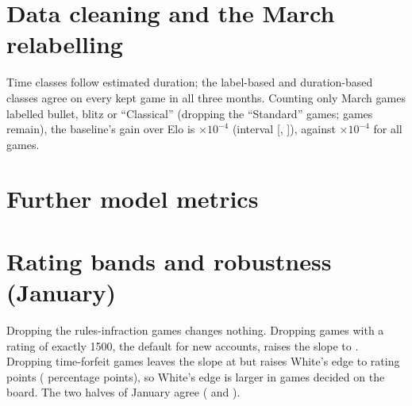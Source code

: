 \documentclass{article}
\newcommand{\tenm}{$\times 10^{-4}$}
\begin{document}
\appendix

\section{Data cleaning and the March relabelling}
\label{app:data}

\begin{table}[h]
  \centering
  \caption{Games removed at each cleaning step, in order.}
  \small
  
\end{table}

Time classes follow estimated duration; the label-based and duration-based classes agree on every kept game in all three months. Counting only March games labelled bullet, blitz or ``Classical'' (dropping the \nStandardMar{} ``Standard'' games; \nMarLabels{} games remain), the baseline's gain over Elo is \dEloBaseMarLabels\tenm{} (interval [\dEloBaseMarLabelsLo{}, \dEloBaseMarLabelsHi{}]), against \dEloBaseMar\tenm{} for all games.

\section{Further model metrics}
\label{app:models}

\begin{table}[h]
  \centering
  \caption{Paired CV differences against the baseline (mean $\pm$ standard error over 5 folds, units of $10^{-4}$), and Brier score and calibration error on both test months; $\pm$ as in Table~\ref{tab:models}.}
  \scriptsize
  \resizebox{\textwidth}{!}{}
\end{table}

\section{Rating bands and robustness (January)}
\label{app:bands}

\begin{table}[h]
  \centering
  \caption{Course baseline refitted on subsets of January; $\pm$ is half the width of the 95\% player-level interval. Bands are of the pair's mean rating.}
  \small
  \resizebox{\textwidth}{!}{}
\end{table}

Dropping the \nInfrJan{} rules-infraction games changes nothing. Dropping games with a rating of exactly 1500, the default for new accounts, raises the slope to \SlopeNoFifteen{}. Dropping time-forfeit games leaves the slope at \SlopeNoForfeit{} but raises White's edge to \EdgePtsNoForfeit{} rating points (\EdgePPNoForfeit{} percentage points), so White's edge is larger in games decided on the board. The two halves of January agree (\SlopeHalfA{} and \SlopeHalfB{}).
\end{document}
